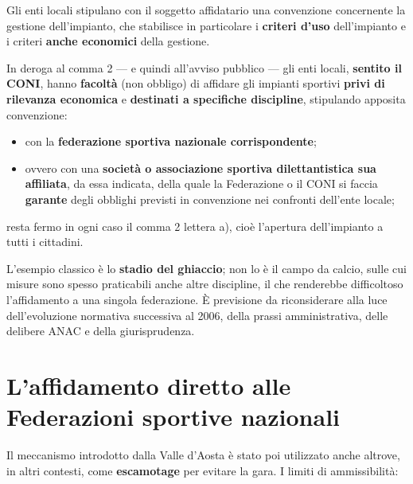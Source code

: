 
Gli enti locali stipulano con il soggetto affidatario una convenzione concernente la gestione
dell'impianto, che stabilisce in particolare i \textbf{criteri d'uso} dell'impianto e i criteri
\textbf{anche economici} della gestione.


In deroga al comma 2 --- e quindi all'avviso pubblico --- gli enti locali, \textbf{sentito il
CONI}, hanno \textbf{facoltà} (non obbligo) di affidare gli impianti sportivi \textbf{privi di
rilevanza economica} e \textbf{destinati a specifiche discipline}, stipulando apposita convenzione:

\begin{itemize}
  \item con la \textbf{federazione sportiva nazionale corrispondente};
  \item ovvero con una \textbf{società o associazione sportiva dilettantistica sua affiliata}, da
    essa indicata, della quale la Federazione o il CONI si faccia \textbf{garante} degli obblighi
    previsti in convenzione nei confronti dell'ente locale;
\end{itemize}

resta fermo in ogni caso il comma 2 lettera a), cioè l'apertura dell'impianto a tutti i cittadini.

L'esempio classico è lo \textbf{stadio del ghiaccio}; non lo è il campo da calcio, sulle cui
misure sono spesso praticabili anche altre discipline, il che renderebbe difficoltoso
l'affidamento a una singola federazione. È previsione da riconsiderare alla luce dell'evoluzione
normativa successiva al 2006, della prassi amministrativa, delle delibere ANAC e della
giurisprudenza.


\section{L'affidamento diretto alle Federazioni sportive nazionali}

Il meccanismo introdotto dalla Valle d'Aosta è stato poi utilizzato anche altrove, in altri
contesti, come \textbf{escamotage} per evitare la gara. I limiti di ammissibilità:

